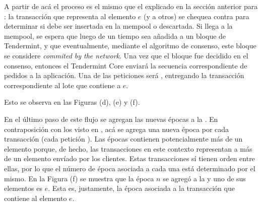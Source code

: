 %

A partir de acá el proceso es el mismo que el explicado en la sección anterior para \vanilla: la transacción
que representa al elemento $e$ (y a otros) se chequea contra \CheckTx para determinar si debe ser insertada
en la mempool o descartada.
%
Si llega a la mempool, se espera que luego de un tiempo sea añadida a un bloque de Tendermint, y que eventualmente,
mediante el algoritmo de consenso, este bloque se considere \textit{commited by the network}.
%
Una vez que el bloque fue decidido en el consenso, entonces el Tendermint Core enviará
la secuencia correspondiente de pedidos a la aplicación.
%
Una de las peticiones será \DeliverTx, entregando la transacción correspondiente al lote que contiene a $e$.

Esto se observa en las Figuras (d), (e) y (f).

%
En el último paso de este flujo se agregan las nuevas épocas a la \setchain.
En contraposición con los visto en \vanilla, acá se agrega una nueva época por cada transacción (cada petición \DeliverTx).
Las épocas contienen potencialmente más de un elemento porque, de hecho, las transacciones en este contexto representan a más de un elemento
envíado por los clientes.
Estas transacciones sí tienen orden entre ellas, por lo que el número de época asociada a cada una está determinado por el mismo.
En la Figura (f) se muestra que la época $n$ se agregó a la \setchain y uno de sus elementos es $e$. Esta es, justamente, la época asociada
a la transacción que contiene al elemento $e$.


